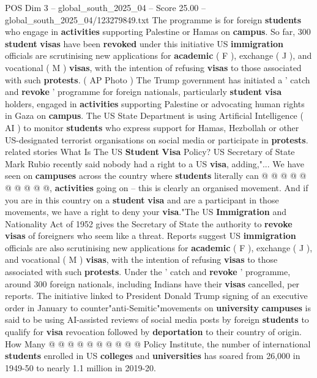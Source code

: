 \begin{textsample}{POS Dim 3 – global\_south\_2025\_04 – Score 25.00 – global\_south\_2025\_04/123279849.txt}  \label{ex:f3_pos_112}
The programme is for foreign \textbf{students} who engage in \textbf{activities} supporting Palestine or Hamas on \textbf{campus}.
So far, 300 \textbf{student} \textbf{visas} have been \textbf{revoked} under this initiative US \textbf{immigration} officials are scrutinising new applications for \textbf{academic} ( F ), exchange ( J ), and vocational ( M ) \textbf{visas}, with the intention of refusing \textbf{visas} to those associated with such \textbf{protests}. ( AP Photo ) The Trump government has initiated a ' catch and \textbf{revoke} ' programme for foreign nationals, particularly \textbf{student} \textbf{visa} holders, engaged in \textbf{activities} supporting Palestine or advocating human rights in Gaza on \textbf{campus}.
The US State Department is using Artificial Intelligence ( AI ) to monitor \textbf{students} who express support for Hamas, Hezbollah or other US-designated terrorist organisations on social media or participate in \textbf{protests}. related stories What Is The US \textbf{Student} \textbf{Visa} Policy?
US Secretary of State Mark Rubio recently said nobody had a right to a US \textbf{visa}, adding,"...
We have seen on \textbf{campuses} across the country where \textbf{students} literally can @ @ @ @ @ @ @ @ @ @, \textbf{activities} going on -- this is clearly an organised movement.
And if you are in this country on a \textbf{student} \textbf{visa} and are a participant in those movements, we have a right to deny your \textbf{visa}."The US \textbf{Immigration} and Nationality Act of 1952 gives the Secretary of State the authority to \textbf{revoke} \textbf{visas} of foreigners who seem like a threat.
Reports suggest US \textbf{immigration} officials are also scrutinising new applications for \textbf{academic} ( F ), exchange ( J ), and vocational ( M ) \textbf{visas}, with the intention of refusing \textbf{visas} to those associated with such \textbf{protests}.
Under the ' catch and \textbf{revoke} ' programme, around 300 foreign nationals, including Indians have their \textbf{visas} cancelled, per reports.
The initiative linked to President Donald Trump signing of an executive order in January to counter"anti-Semitic"movements on \textbf{university} \textbf{campuses} is said to be using AI-assisted reviews of social media posts by foreign \textbf{students} to qualify for \textbf{visa} revocation followed by \textbf{deportation} to their country of origin.
How Many @ @ @ @ @ @ @ @ @ @ Policy Institute, the number of international \textbf{students} enrolled in US \textbf{colleges} and \textbf{universities} has soared from 26,000 in 1949-50 to nearly 1.1 million in 2019-20.

\end{textsample}
